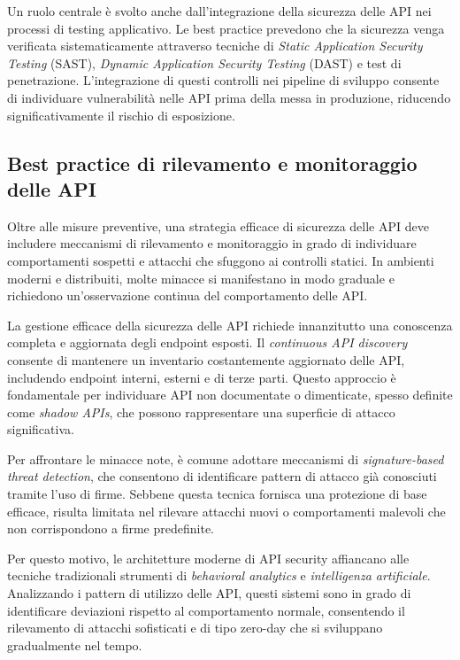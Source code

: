 Un ruolo centrale è svolto anche dall’integrazione della sicurezza delle API nei processi di testing applicativo. Le best practice prevedono che la sicurezza venga verificata sistematicamente attraverso tecniche di \emph{Static Application Security Testing} (SAST), \emph{Dynamic Application Security Testing} (DAST) e test di penetrazione. L’integrazione di questi controlli nei pipeline di sviluppo consente di individuare vulnerabilità nelle API prima della messa in produzione, riducendo significativamente il rischio di esposizione.

\subsection{Best practice di rilevamento e monitoraggio delle API}

Oltre alle misure preventive, una strategia efficace di sicurezza delle API deve includere meccanismi di rilevamento e monitoraggio in grado di individuare comportamenti sospetti e attacchi che sfuggono ai controlli statici. In ambienti moderni e distribuiti, molte minacce si manifestano in modo graduale e richiedono un’osservazione continua del comportamento delle API.

La gestione efficace della sicurezza delle API richiede innanzitutto una conoscenza completa e aggiornata degli endpoint esposti. Il \emph{continuous API discovery} consente di mantenere un inventario costantemente aggiornato delle API, includendo endpoint interni, esterni e di terze parti. Questo approccio è fondamentale per individuare API non documentate o dimenticate, spesso definite come \emph{shadow APIs}, che possono rappresentare una superficie di attacco significativa.

Per affrontare le minacce note, è comune adottare meccanismi di \emph{signature-based threat detection}, che consentono di identificare pattern di attacco già conosciuti tramite l’uso di firme. Sebbene questa tecnica fornisca una protezione di base efficace, risulta limitata nel rilevare attacchi nuovi o comportamenti malevoli che non corrispondono a firme predefinite.

Per questo motivo, le architetture moderne di API security affiancano alle tecniche tradizionali strumenti di \emph{behavioral analytics} e \emph{intelligenza artificiale}. Analizzando i pattern di utilizzo delle API, questi sistemi sono in grado di identificare deviazioni rispetto al comportamento normale, consentendo il rilevamento di attacchi sofisticati e di tipo zero-day che si sviluppano gradualmente nel tempo.

